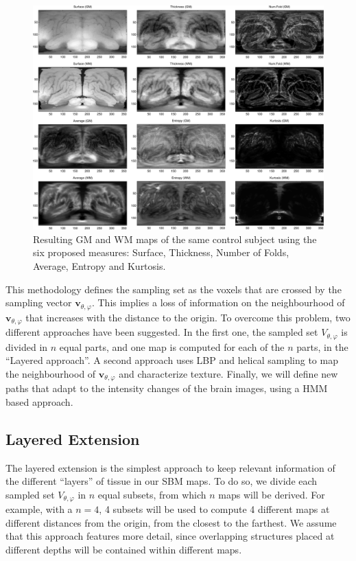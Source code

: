 \begin{figure}[htp]
	\centering
	\includegraphics[width=1\textwidth]{Graphics/ch6/03-projections}
	\caption{Resulting \acs{GM} and \acs{WM} maps of the same control subject using the six proposed measures: Surface, Thickness, Number of Folds, Average, Entropy and Kurtosis.}
	\label{fig:masksGM}
\end{figure}

This methodology defines the sampling set as the voxels that are crossed by the sampling vector $\mathbf{v}_{\theta,\varphi}$. This implies a loss of information on the neighbourhood of $\mathbf{v}_{\theta,\varphi}$ that increases with the distance to the origin. To overcome this problem, two different approaches have been suggested. In the first one, the sampled set $V_{\theta,\varphi}$ is divided in $n$ equal parts, and one map is computed for each of the $n$ parts, in the ``Layered approach''. A second approach uses \acf{LBP} and helical sampling to map the neighbourhood of $\mathbf{v}_{\theta,\varphi}$ and characterize texture. Finally, we will define new paths that adapt to the intensity changes of the brain images, using a \ac{HMM} based approach. 

\subsection{Layered Extension}\label{sec:layered}
The layered extension is the simplest approach to keep relevant information of the different ``layers'' of tissue in our \ac{SBM} maps. To do so, we divide each sampled set $V_{\theta,\varphi}$ in $n$ equal subsets, from which $n$ maps will be derived. For example, with a $n=4$, 4 subsets will be used to compute 4 different maps at different distances from the origin, from the closest to the farthest. We assume that this approach features more detail, since overlapping structures placed at different depths will be contained within different maps. 

